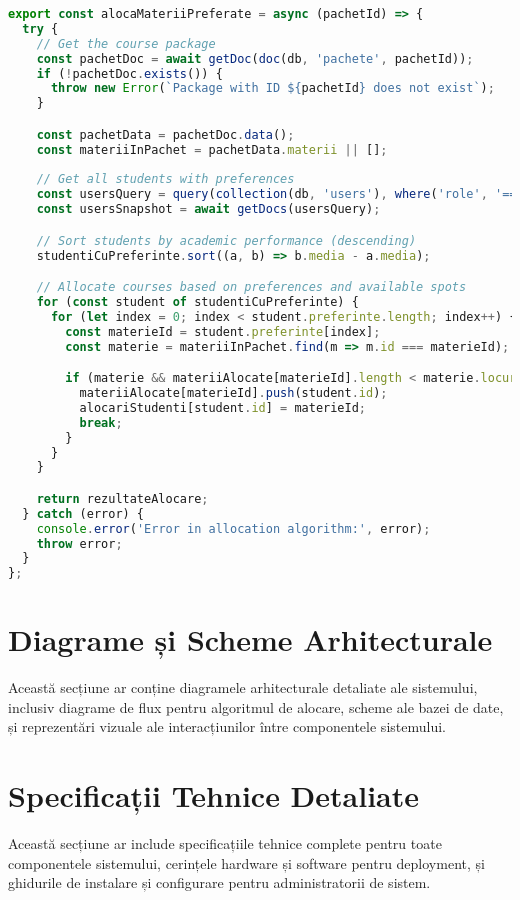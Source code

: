\documentclass[12pt,a4paper]{report}
\begin{document}
\begin{lstlisting}[language=JavaScript, caption=Implementarea Algoritmului de Alocare]
export const alocaMateriiPreferate = async (pachetId) => {
  try {
    // Get the course package
    const pachetDoc = await getDoc(doc(db, 'pachete', pachetId));
    if (!pachetDoc.exists()) {
      throw new Error(`Package with ID ${pachetId} does not exist`);
    }

    const pachetData = pachetDoc.data();
    const materiiInPachet = pachetData.materii || [];
    
    // Get all students with preferences
    const usersQuery = query(collection(db, 'users'), where('role', '==', 'student'));
    const usersSnapshot = await getDocs(usersQuery);

    // Sort students by academic performance (descending)
    studentiCuPreferinte.sort((a, b) => b.media - a.media);

    // Allocate courses based on preferences and available spots
    for (const student of studentiCuPreferinte) {
      for (let index = 0; index < student.preferinte.length; index++) {
        const materieId = student.preferinte[index];
        const materie = materiiInPachet.find(m => m.id === materieId);

        if (materie && materiiAlocate[materieId].length < materie.locuriDisponibile) {
          materiiAlocate[materieId].push(student.id);
          alocariStudenti[student.id] = materieId;
          break;
        }
      }
    }

    return rezultateAlocare;
  } catch (error) {
    console.error('Error in allocation algorithm:', error);
    throw error;
  }
};
\end{lstlisting}

\section{Diagrame și Scheme Arhitecturale}

Această secțiune ar conține diagramele arhitecturale detaliate ale sistemului, inclusiv diagrame de flux pentru algoritmul de alocare, scheme ale bazei de date, și reprezentări vizuale ale interacțiunilor între componentele sistemului.

\section{Specificații Tehnice Detaliate}

Această secțiune ar include specificațiile tehnice complete pentru toate componentele sistemului, cerințele hardware și software pentru deployment, și ghidurile de instalare și configurare pentru administratorii de sistem.
\end{document}
